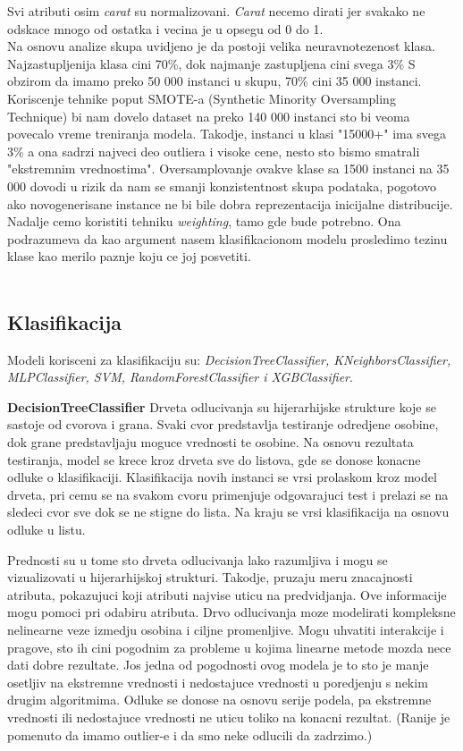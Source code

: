 \documentclass[10pt]{article}
\begin{document}
Svi atributi osim \textit{carat} su normalizovani. \textit{Carat} necemo dirati jer svakako ne odskace mnogo od ostatka i vecina je u opsegu od 0 do 1.\\

Na osnovu analize skupa uvidjeno je da postoji velika neuravnotezenost klasa. Najzastupljenija klasa cini 70\%, dok najmanje zastupljena cini svega 3\%
S obzirom da imamo preko 50 000 instanci u skupu, 70\% cini 35 000 instanci. Koriscenje tehnike poput SMOTE-a (Synthetic Minority Oversampling Technique) bi nam dovelo dataset na preko 140 000 instanci sto bi veoma povecalo vreme treniranja modela.
Takodje, instanci u klasi "15000+" ima svega 3\% a ona sadrzi najveci deo outliera i visoke cene, nesto sto bismo smatrali "ekstremnim vrednostima". Oversamplovanje ovakve klase sa 1500 instanci na 35 000 dovodi u rizik da nam se smanji konzistentnost skupa podataka, pogotovo ako novogenerisane instance ne bi bile dobra reprezentacija inicijalne distribucije. Nadalje cemo koristiti tehniku \textit{weighting}, tamo gde bude potrebno. Ona podrazumeva da kao argument nasem klasifikacionom modelu prosledimo tezinu klase kao merilo paznje koju ce joj posvetiti.\\\\

\subsection{Klasifikacija}
Modeli korisceni za klasifikaciju su: \textit{DecisionTreeClassifier, KNeighborsClassifier, MLPClassifier, SVM, RandomForestClassifier i XGBClassifier}.

\textbf{DecisionTreeClassifier}
Drveta odlucivanja su hijerarhijske strukture koje se sastoje od cvorova i grana. Svaki cvor predstavlja testiranje odredjene osobine, dok grane predstavljaju moguce vrednosti te osobine. Na osnovu rezultata testiranja, model se krece kroz drveta sve do listova, gde se donose konacne odluke o klasifikaciji. Klasifikacija novih instanci se vrsi prolaskom kroz model drveta, pri cemu se na svakom cvoru primenjuje odgovarajuci test i prelazi se na sledeci cvor sve dok se ne stigne do lista. Na kraju se vrsi klasifikacija na osnovu odluke u listu.

Prednosti su u tome sto drveta odlucivanja lako razumljiva i mogu se vizualizovati u hijerarhijskoj strukturi. Takodje, pruzaju meru znacajnosti atributa, pokazujuci koji atributi najvise uticu na predvidjanja. Ove informacije mogu pomoci pri odabiru atributa. Drvo odlucivanja moze modelirati kompleksne nelinearne veze izmedju osobina i ciljne promenljive. Mogu uhvatiti interakcije i pragove, sto ih cini pogodnim za probleme u kojima linearne metode mozda nece dati dobre rezultate. Jos jedna od pogodnosti ovog modela je to sto je manje osetljiv na ekstremne vrednosti i nedostajuce vrednosti u poredjenju s nekim drugim algoritmima. Odluke se donose na osnovu serije podela, pa ekstremne vrednosti ili nedostajuce vrednosti ne uticu toliko na konacni rezultat. (Ranije je pomenuto da imamo outlier-e i da smo neke odlucili da zadrzimo.)\\
\end{document}
